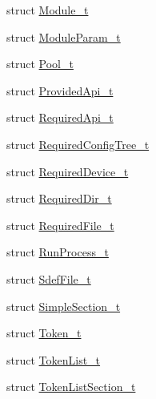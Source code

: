 \begin{DoxyCompactItemize}
\item 
struct \hyperlink{structparse_tree_1_1_module__t}{Module\+\_\+t}
\item 
struct \hyperlink{structparse_tree_1_1_module_param__t}{Module\+Param\+\_\+t}
\item 
struct \hyperlink{structparse_tree_1_1_pool__t}{Pool\+\_\+t}
\item 
struct \hyperlink{structparse_tree_1_1_provided_api__t}{Provided\+Api\+\_\+t}
\item 
struct \hyperlink{structparse_tree_1_1_required_api__t}{Required\+Api\+\_\+t}
\item 
struct \hyperlink{structparse_tree_1_1_required_config_tree__t}{Required\+Config\+Tree\+\_\+t}
\item 
struct \hyperlink{structparse_tree_1_1_required_device__t}{Required\+Device\+\_\+t}
\item 
struct \hyperlink{structparse_tree_1_1_required_dir__t}{Required\+Dir\+\_\+t}
\item 
struct \hyperlink{structparse_tree_1_1_required_file__t}{Required\+File\+\_\+t}
\item 
struct \hyperlink{structparse_tree_1_1_run_process__t}{Run\+Process\+\_\+t}
\item 
struct \hyperlink{structparse_tree_1_1_sdef_file__t}{Sdef\+File\+\_\+t}
\item 
struct \hyperlink{structparse_tree_1_1_simple_section__t}{Simple\+Section\+\_\+t}
\item 
struct \hyperlink{structparse_tree_1_1_token__t}{Token\+\_\+t}
\item 
struct \hyperlink{structparse_tree_1_1_token_list__t}{Token\+List\+\_\+t}
\item 
struct \hyperlink{structparse_tree_1_1_token_list_section__t}{Token\+List\+Section\+\_\+t}
\end{DoxyCompactItemize}
